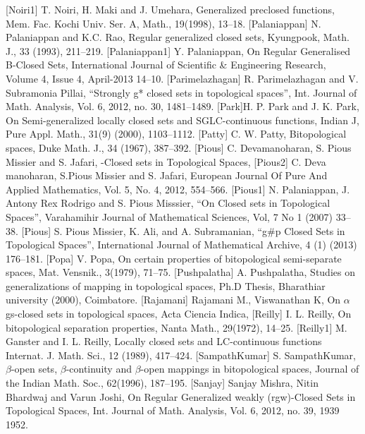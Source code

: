 \begin{thebibliography}{99}
 [Noiri1] T. Noiri, H. Maki and J. Umehara, Generalized preclosed functions, Mem. Fac. Kochi Univ. Ser. A, Math., 19(1998), 13--18.
 [Palaniappan] N. Palaniappan and K.C. Rao, Regular generalized closed sets, Kyungpook, Math. J., 33 (1993), 211--219.
 [Palaniappan1] Y. Palaniappan, On Regular Generalised B-Closed Sets,  International Journal of 	Scientific \& Engineering Research, Volume 4, Issue 4, April-2013 14--10.
 [Parimelazhagan] R. Parimelazhagan and V. Subramonia Pillai, ``Strongly g* closed sets in topological spaces'',	Int. Journal of Math. Analysis, Vol. 6, 2012, no. 30, 1481--1489.
 [Park]H. P. Park and J. K. Park, On Semi-generalized locally closed sets and SGLC-continuous functions, Indian J, Pure Appl. Math., 31(9) (2000), 1103--1112.
 [Patty] C. W. Patty, Bitopological spaces, Duke Math. J., 34 (1967), 387--392.
 [Pious] C. Devamanoharan, S. Pious Missier and S. Jafari, -Closed sets in Topological Spaces,
 [Pious2] C. Deva manoharan, S.Pious Missier and S. Jafari, European Journal Of Pure And	Applied Mathematics, Vol. 5, No. 4, 2012, 554--566.
 [Pious1] N. Palaniappan, J. Antony Rex Rodrigo and S. Pious Misssier, ``On Closed sets in Topological Spaces'', Varahamihir Journal of Mathematical Sciences, Vol, 7 No 1 (2007) 33--38.
 [Pious]	S. Pious Missier, K. Ali, and A. Subramanian, ``g\#p  Closed Sets in Topological Spaces'', International Journal of Mathematical Archive, 4 (1) (2013) 176--181.
 [Popa] V. Popa, On certain properties of bitopological semi-separate spaces, Mat. Vensnik., 3(1979), 71--75.
 [Pushpalatha] A. Pushpalatha, Studies on generalizations of mapping in topological spaces, Ph.D Thesis, Bharathiar university (2000), Coimbatore.
 [Rajamani] Rajamani M., Viswanathan K, On $\alpha$gs-closed sets in topological spaces, Acta Ciencia Indica,
 [Reilly] I. L. Reilly, On bitopological separation properties, Nanta Math., 29(1972), 14--25.
 [Reilly1] M. Ganster and I. L. Reilly, Locally closed sets and LC-continuous functions Internat. J. Math. Sci., 12 (1989), 417--424.
 [SampathKumar] S. SampathKumar, $\beta$-open sets, $\beta$-continuity and $\beta$-open mappings in bitopological spaces, Journal of the Indian Math. Soc., 62(1996), 187--195.
 [Sanjay] Sanjay Mishra, Nitin Bhardwaj and Varun Joshi, On Regular Generalized weakly (rgw)-Closed Sets in Topological Spaces, Int. Journal of Math. Analysis, Vol. 6, 2012, no. 39, 1939 1952.

\end{thebibliography}
